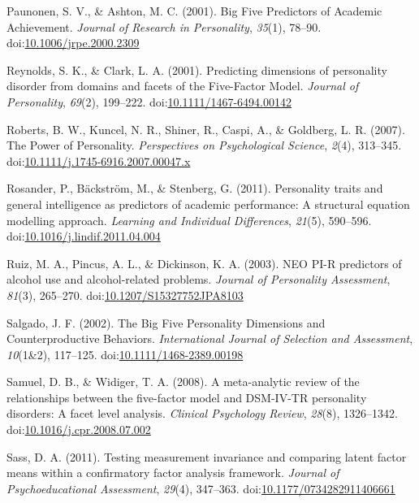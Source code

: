 \documentclass[,man,floatsintext]{apa6}
\theoremstyle{definition}
\theoremstyle{definition}
\theoremstyle{definition}
\theoremstyle{remark}
\begin{document}
\leavevmode\hypertarget{ref-Paunonen2001}{}%
Paunonen, S. V., \& Ashton, M. C. (2001). Big Five Predictors of
Academic Achievement. \emph{Journal of Research in Personality},
\emph{35}(1), 78--90.
doi:\href{https://doi.org/10.1006/jrpe.2000.2309}{10.1006/jrpe.2000.2309}

\leavevmode\hypertarget{ref-ClarkReynolds2001}{}%
Reynolds, S. K., \& Clark, L. A. (2001). Predicting dimensions of
personality disorder from domains and facets of the Five-Factor Model.
\emph{Journal of Personality}, \emph{69}(2), 199--222.
doi:\href{https://doi.org/10.1111/1467-6494.00142}{10.1111/1467-6494.00142}

\leavevmode\hypertarget{ref-Roberts2007a}{}%
Roberts, B. W., Kuncel, N. R., Shiner, R., Caspi, A., \& Goldberg, L. R.
(2007). The Power of Personality. \emph{Perspectives on Psychological
Science}, \emph{2}(4), 313--345.
doi:\href{https://doi.org/10.1111/j.1745-6916.2007.00047.x}{10.1111/j.1745-6916.2007.00047.x}

\leavevmode\hypertarget{ref-Rosander2011}{}%
Rosander, P., Bäckström, M., \& Stenberg, G. (2011). Personality traits
and general intelligence as predictors of academic performance: A
structural equation modelling approach. \emph{Learning and Individual
Differences}, \emph{21}(5), 590--596.
doi:\href{https://doi.org/10.1016/j.lindif.2011.04.004}{10.1016/j.lindif.2011.04.004}

\leavevmode\hypertarget{ref-Ruiz2003}{}%
Ruiz, M. A., Pincus, A. L., \& Dickinson, K. A. (2003). NEO PI-R
predictors of alcohol use and alcohol-related problems. \emph{Journal of
Personality Assessment}, \emph{81}(3), 265--270.
doi:\href{https://doi.org/10.1207/S15327752JPA8103}{10.1207/S15327752JPA8103}

\leavevmode\hypertarget{ref-Salgado2002}{}%
Salgado, J. F. (2002). The Big Five Personality Dimensions and
Counterproductive Behaviors. \emph{International Journal of Selection
and Assessment}, \emph{10}(1\&2), 117--125.
doi:\href{https://doi.org/10.1111/1468-2389.00198}{10.1111/1468-2389.00198}

\leavevmode\hypertarget{ref-SamuelWidiger2008}{}%
Samuel, D. B., \& Widiger, T. A. (2008). A meta-analytic review of the
relationships between the five-factor model and DSM-IV-TR personality
disorders: A facet level analysis. \emph{Clinical Psychology Review},
\emph{28}(8), 1326--1342.
doi:\href{https://doi.org/10.1016/j.cpr.2008.07.002}{10.1016/j.cpr.2008.07.002}

\leavevmode\hypertarget{ref-Sass2011}{}%
Sass, D. A. (2011). Testing measurement invariance and comparing latent
factor means within a confirmatory factor analysis framework.
\emph{Journal of Psychoeducational Assessment}, \emph{29}(4), 347--363.
doi:\href{https://doi.org/10.1177/0734282911406661}{10.1177/0734282911406661}
\end{document}

